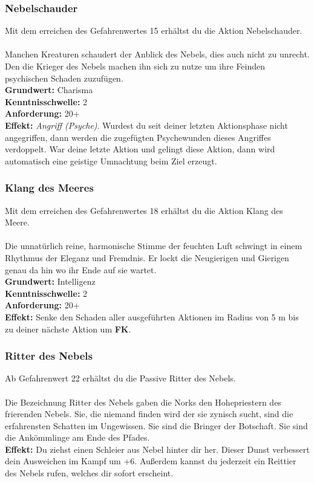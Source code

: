 \subsubsection*{ Nebelschauder} \label{sk:nebelschaueder}
Mit dem erreichen des Gefahrenwertes 15 erhältst du die Aktion Nebelschauder.\\
\\
Manchen Kreaturen schaudert der Anblick des Nebels, dies auch nicht zu unrecht. Den die Krieger des Nebels machen ihn sich zu nutze um ihre Feinden psychischen Schaden zuzufügen.\\
\textbf{Grundwert:} Charisma \\
\textbf{Kenntnisschwelle:} 2 \\
\textbf{Anforderung:} 20+ \\
\textbf{Effekt:} \textit{Angriff (Psyche)}. Wurdest du seit deiner letzten Aktionsphase nicht angegriffen, dann werden die zugefügten Psychewunden dieses Angriffes verdoppelt. War deine letzte Aktion  und gelingt diese Aktion, dann wird automatisch eine geistige Umnachtung beim Ziel erzeugt.

\subsubsection*{ Klang des Meeres} \label{sk:klang_des_meeres}
Mit dem erreichen des Gefahrenwertes 18 erhältst du die Aktion Klang des Meere.\\
\\
Die unnatürlich reine, harmonische Stimme der feuchten Luft schwingt in einem Rhythmus der Eleganz und Fremdnis. Er lockt die Neugierigen und Gierigen genau da hin wo ihr Ende auf sie wartet.\\
\textbf{Grundwert:} Intelligenz \\
\textbf{Kenntnisschwelle:} 2 \\
\textbf{Anforderung:} 20+ \\
\textbf{Effekt:} Senke den Schaden aller ausgeführten Aktionen im Radius von 5 m bis zu deiner nächste Aktion um \textbf{FK}.


\subsubsection*{ Ritter des Nebels} \label{sk:ritter_des_nebels}
Ab Gefahrenwert 22 erhältst du die Passive Ritter des Nebels.\\
\\
Die Bezeichnung Ritter des Nebels gaben die Norks den Hohepriestern des frierenden Nebels. Sie, die niemand finden wird der sie zynisch sucht, sind die erfahrensten Schatten im Ungewissen. Sie sind die Bringer der Botschaft. Sie sind die Ankömmlinge am Ende des Pfades.\\
\textbf{Effekt:} Du ziehst einen Schleier aus Nebel hinter dir her. Dieser Dunst verbessert dein Ausweichen im Kampf um +6. Außerdem kannst du jederzeit ein Reittier des Nebels rufen, welches dir sofort erscheint.   


